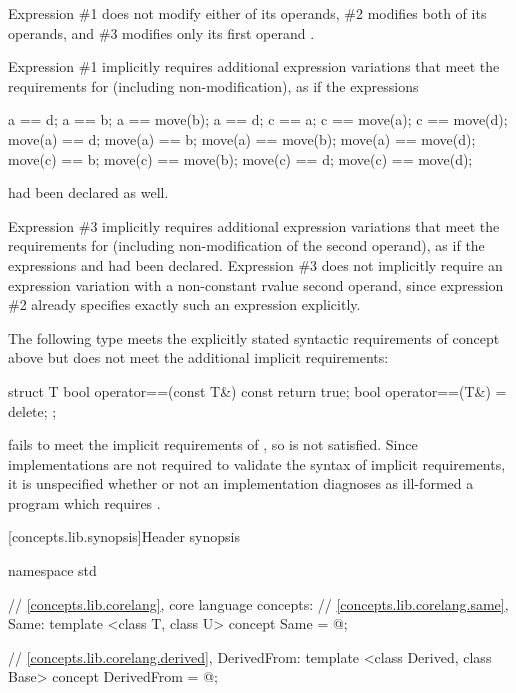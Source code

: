 \begin{addedblock}
Expression \#1 does not modify either of its operands, \#2 modifies both of its
operands, and \#3 modifies only its first operand .

Expression \#1 implicitly requires additional expression variations that meet the
requirements for  (including non-modification), as if the expressions
\begin{codeblock}
a == d;       a == b;             a == move(b);       a == d;
c == a;       c == move(a);       c == move(d);
move(a) == d; move(a) == b;       move(a) == move(b); move(a) == move(d);
move(c) == b; move(c) == move(b); move(c) == d;       move(c) == move(d);
\end{codeblock}
had been declared as well.

Expression \#3 implicitly requires additional expression variations that meet the
requirements for  (including non-modification of the second operand),
as if the expressions  and  had been declared.
Expression \#3 does not implicitly require an expression variation with a
non-constant rvalue second operand, since expression \#2 already specifies exactly
such an expression explicitly.
\exitexample

\enterexample
The following type  meets the explicitly stated syntactic requirements
of concept  above but does not meet the additional implicit requirements:

\begin{codeblock}
struct T {
  bool operator==(const T&) const { return true; }
  bool operator==(T&) = delete;
};
\end{codeblock}

 fails to meet the implicit
requirements of , so  is not satisfied. Since
implementations are not required to validate the syntax of implicit requirements, it
is unspecified whether or not an implementation diagnoses as ill-formed a program
which requires .
\exitexample

[concepts.lib.synopsis]{Header  synopsis}

%
\begin{codeblock}
namespace std {
  // \ref{concepts.lib.corelang}, core language concepts:
  // \ref{concepts.lib.corelang.same}, Same:
  template <class T, class U>
  concept Same = @\seebelow@;

  // \ref{concepts.lib.corelang.derived}, DerivedFrom:
  template <class Derived, class Base>
  concept DerivedFrom = @\seebelow@;

}
\end{codeblock}
\end{addedblock}
